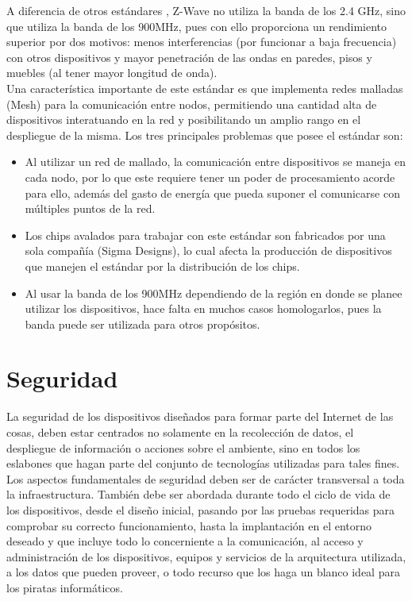 A diferencia de otros estándares , Z-Wave no utiliza la banda de los 2.4 GHz, sino que utiliza la banda de los 900MHz, pues con ello proporciona un rendimiento superior por dos motivos: menos interferencias (por funcionar a baja frecuencia) con otros dispositivos y mayor penetración de las ondas en paredes, pisos y muebles (al tener mayor longitud de onda).\cite{pandomzwave}\\

Una característica importante de este estándar es que  implementa redes malladas (Mesh) para la comunicación entre nodos, permitiendo una cantidad alta de dispositivos interatuando en la red y posibilitando un amplio rango en el despliegue de la misma. Los tres principales problemas que posee el estándar son:
\begin{itemize}
\item  Al utilizar un red de mallado, la comunicación entre dispositivos se maneja en cada nodo, por lo que este requiere tener un poder de procesamiento acorde para ello, además del gasto de energía que pueda suponer el comunicarse con múltiples puntos de la red.
\item Los chips avalados para trabajar con este estándar son fabricados por una sola compañía (Sigma Designs), lo cual afecta la producción de dispositivos  que manejen el estándar por la distribución de los chips.
\item Al usar la banda de los 900MHz dependiendo de la región en donde se planee utilizar los dispositivos, hace falta en muchos casos homologarlos, pues la banda puede ser utilizada para otros propósitos.
\end{itemize}

\section{Seguridad}
La seguridad de los dispositivos diseñados para formar parte del Internet de las cosas, deben estar centrados no solamente en la recolección de datos, el despliegue de información o acciones sobre el ambiente, sino en todos los eslabones que hagan parte del conjunto de tecnologías utilizadas para tales fines.\\

Los aspectos fundamentales de seguridad deben ser de carácter transversal a toda la infraestructura. También debe ser abordada durante todo el ciclo de vida de los dispositivos, desde el diseño inicial, pasando por las pruebas requeridas para comprobar su correcto funcionamiento, hasta la implantación en el entorno deseado y que incluye todo lo concerniente a la comunicación, al acceso y administración de los dispositivos, equipos y servicios de la arquitectura utilizada, a los datos que pueden proveer, o todo recurso que los haga un blanco ideal para los piratas informáticos.\\

